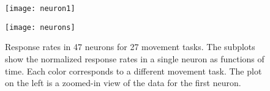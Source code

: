 \begin{figure}[tbh]
    \centering
    \begin{minipage}{0.38\textwidth}
        \begin{center}
            \texttt{[image: neuron1]}
        \end{center}
    \end{minipage}
    \begin{minipage}{0.61\textwidth}
        \begin{center}
            \texttt{[image: neurons]}
        \end{center}
    \end{minipage}
    \caption{
        Response rates in 47 neurons for 27 movement tasks.  The subplots show
        the normalized response rates in a single neuron as functions of time.  
        Each color corresponds to a different movement task.  The plot on
        the left is a zoomed-in view of the data for the first neuron.
    }
\end{figure}

